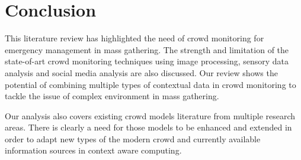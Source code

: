 \section{Conclusion}
This literature review has highlighted the need of crowd monitoring for emergency management in mass gathering. The strength and limitation of the state-of-art crowd monitoring techniques using image processing, sensory data analysis and social media analysis are also discussed. Our review shows the potential of combining multiple types of contextual data in crowd monitoring to tackle the issue of complex environment in mass gathering.

Our analysis also covers existing crowd models literature from multiple research areas. There is clearly a need for those models to be enhanced and extended in order to adapt new types of the modern crowd and currently available information sources in context aware computing.